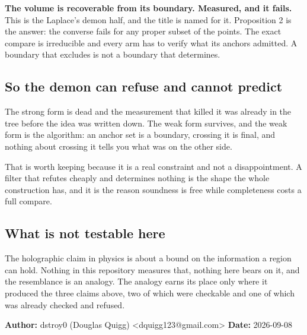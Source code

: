 \textbf{The volume is recoverable from its boundary. Measured, and it fails.} This is the Laplace's demon half, and the title is named for it. Proposition 2 is the answer: the converse fails for any proper subset of the points. The exact compare is irreducible and every arm has to verify what its anchors admitted. A boundary that excludes is not a boundary that determines.

\subsection{So the demon can refuse and cannot predict}

The strong form is dead and the measurement that killed it was already in the tree before the idea was written down. The weak form survives, and the weak form is the algorithm: an anchor set is a boundary, crossing it is final, and nothing about crossing it tells you what was on the other side.

That is worth keeping because it is a real constraint and not a disappointment. A filter that refutes cheaply and determines nothing is the shape the whole construction has, and it is the reason soundness is free while completeness costs a full compare.

\subsection{What is not testable here}

The holographic claim in physics is about a bound on the information a region can hold. Nothing in this repository measures that, nothing here bears on it, and the resemblance is an analogy. The analogy earns its place only where it produced the three claims above, two of which were checkable and one of which was already checked and refused.

\textbf{Author:} dstroy0 (Douglas Quigg) <dquigg123@gmail.com> \textbf{Date:} 2026-09-08


